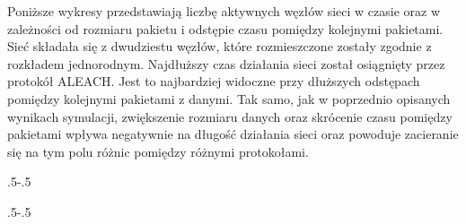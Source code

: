 Poniższe wykresy przedstawiają liczbę aktywnych węzłów sieci w czasie oraz w zależności od rozmiaru pakietu i odstępie czasu pomiędzy kolejnymi pakietami. Sieć składała się z dwudziestu węzłów, które rozmieszczone zostały zgodnie z rozkładem jednorodnym.
Najdłuższy czas działania sieci został osiągnięty przez protokół ALEACH. Jest to najbardziej widoczne przy dłuższych odstępach pomiędzy kolejnymi pakietami z danymi.
Tak samo, jak w poprzednio opisanych wynikach symulacji, zwiększenie rozmiaru danych oraz skrócenie czasu pomiędzy pakietami wpływa negatywnie na długość działania sieci oraz powoduje zacieranie się na tym polu różnic pomiędzy różnymi protokołami.


\clearpage
\thispagestyle{empty}

{\pdfpagewidth
    \vspace*{-2cm}
    \noindent\kern.5\pdfpagewidth{}\kern-.5\pdfpagewidth
     \par
     \vspace*{-5cm}
\clearpage
\thispagestyle{empty}
    \vspace*{-2cm}
    \noindent\parbox{\textwidth}{%
    \noindent{}\endgraf
    \vspace{2ex}%
    }
     \par
     \vspace*{-5cm}
\clearpage
}

\clearpage
\thispagestyle{empty}

{\pdfpagewidth
    \vspace*{-2cm}
    \noindent\kern.5\pdfpagewidth{}\kern-.5\pdfpagewidth
     \par
     \vspace*{-5cm}
\clearpage
\thispagestyle{empty}
    \vspace*{-2cm}
    \noindent\parbox{\textwidth}{%
    \noindent{}\endgraf
    \vspace{2ex}%
    }
     \par
     \vspace*{-5cm}
\clearpage
}
